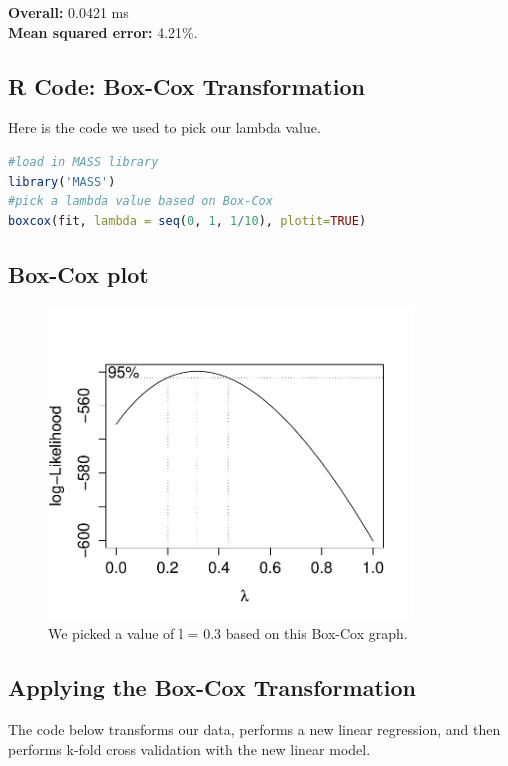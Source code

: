 \documentclass{article}
\begin{document}
\noindent
\textbf{Overall:} 0.0421 ms \\
\textbf{Mean squared error:} 4.21\%.

\subsection{R Code: Box-Cox Transformation}
Here is the code we used to pick our lambda value.
\begin{lstlisting}[language=r]
#load in MASS library
library('MASS')
#pick a lambda value based on Box-Cox
boxcox(fit, lambda = seq(0, 1, 1/10), plotit=TRUE)
\end{lstlisting}

\subsection{Box-Cox plot}
\begin{figure}[H]
\centering
\includegraphics[width=3.8in]{boxcox.pdf}
\caption{We picked a value of l = 0.3 based on this Box-Cox graph.
}\label{fig_container} 
\end{figure}

\subsection{Applying the Box-Cox Transformation}
The code below transforms our data, performs a new linear regression, and then
performs k-fold cross validation with the new linear model. 
\end{document}
